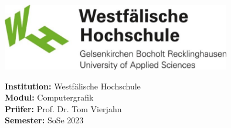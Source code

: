 \begin{titlepage}
    \maketitle
    \vspace{3cm}
    \begin{center}
        \includegraphics[width={0.75\textwidth}]{../assets/img/whs}
    \end{center}
    \vspace*{\fill}
    \begin{flushleft}
        \Large{\textbf{Institution:} Westfälische Hochschule}\\
        \Large{\textbf{Modul:} Computergrafik} \\
        \Large{\textbf{Prüfer:} Prof. Dr. Tom Vierjahn}\\
        \Large{\textbf{Semester:} SoSe 2023}
    \end{flushleft}
\end{titlepage}
